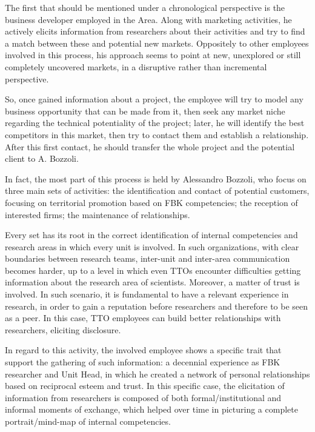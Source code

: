 The first that should be mentioned under a chronological perspective is the business developer employed in the Area. Along with marketing activities, he actively elicits information from researchers about their activities and try to find a match between these and potential new markets. Oppositely to other employees involved in this process, his approach seems to point at new, unexplored or still completely uncovered markets, in a disruptive rather than incremental perspective. 

So, once gained information about a project, the employee will try to model any business opportunity that can be made from it, then seek any market niche regarding the technical potentiality of the project; later, he will identify the best competitors in this market, then try to contact them and establish a relationship. After this first contact, he should transfer the whole project and the potential client to A. Bozzoli.

In fact, the most part of this process is held by Alessandro Bozzoli, who focus on three main sets of activities: the identification and contact of potential customers, focusing on territorial promotion based on FBK competencies; the reception of interested firms; the maintenance of relationships. 

Every set has its root in the correct identification of internal competencies and research areas in which every unit is involved. In such organizations, with clear boundaries between research teams, inter-unit and inter-area communication becomes harder, up to a level in which even TTOs encounter difficulties getting information about the research area of scientists. Moreover, a matter of trust is involved. In such scenario, it is fundamental to have a relevant experience in research, in order to gain a reputation before researchers and therefore to be seen as a peer. In this case, TTO employees can build better relationships with researchers, eliciting disclosure.

In regard to this activity, the involved employee shows a specific trait that support the gathering of such information: a decennial experience as FBK researcher and Unit Head, in which he created a network of personal relationships based on reciprocal esteem and trust. In this specific case, the elicitation of information from researchers is composed of both formal/institutional and informal moments of exchange, which helped over time in picturing a complete portrait/mind-map of internal competencies.

